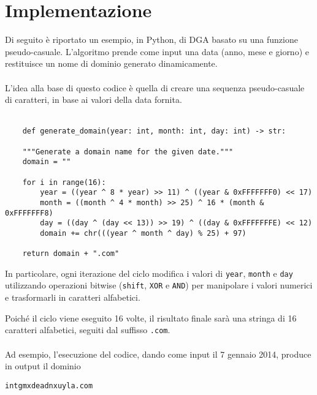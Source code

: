 \section*{Implementazione}
Di seguito è riportato un esempio, in Python, di DGA basato su una 
funzione pseudo-casuale. L'algoritmo prende come input una data (anno, 
mese e giorno) e restituisce un nome di dominio generato dinamicamente.
\\\\
L'idea alla base di questo codice è quella di creare una 
sequenza pseudo-casuale di caratteri, in base ai valori 
della data fornita.
\\\\
\begin{lstlisting}
    def generate_domain(year: int, month: int, day: int) -> str:
    
    """Generate a domain name for the given date."""
    domain = ""
    
    for i in range(16):
        year = ((year ^ 8 * year) >> 11) ^ ((year & 0xFFFFFFF0) << 17)
        month = ((month ^ 4 * month) >> 25) ^ 16 * (month & 0xFFFFFFF8)
        day = ((day ^ (day << 13)) >> 19) ^ ((day & 0xFFFFFFFE) << 12)
        domain += chr(((year ^ month ^ day) % 25) + 97)
    
    return domain + ".com"
\end{lstlisting}

In particolare, ogni iterazione del ciclo modifica i valori di \texttt{year}, 
\texttt{month} e \texttt{day} utilizzando operazioni bitwise (\texttt{shift}, 
\texttt{XOR} e \texttt{AND}) per manipolare i valori numerici e trasformarli 
in caratteri alfabetici.

Poiché il ciclo viene eseguito 16 volte, il risultato finale sarà 
una stringa di 16 caratteri alfabetici, seguiti dal suffisso \texttt{.com}.
\\\\
Ad esempio, l'esecuzione del codice, dando come input il 7 gennaio 2014, 
produce in output il dominio

\texttt{intgmxdeadnxuyla.com}
